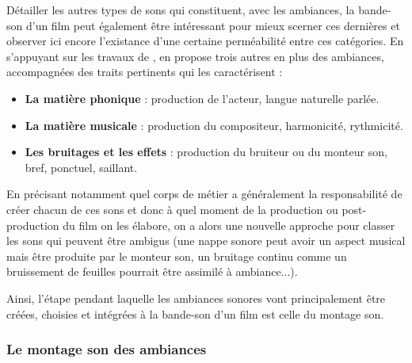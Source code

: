 ﻿\documentclass[12pt]{article}
\begin{document}
Détailler les autres types de sons qui constituent, avec les ambiances, la bande-son d'un film peut également être intéressant pour mieux scerner ces dernières et observer ici encore l'existance d'une certaine perméabilité entre ces catégories. En s'appuyant sur les travaux de \textcite{balibar2015chaine}, \textcite{denizart_lemergence_2017} en propose trois autres en plus des ambiances, accompagnées des traits pertinents qui les caractérisent :
\vspace{1em}

\begin{itemize}
    \setlength\itemsep{0.8em}
    \item \textbf{La matière phonique} : production de l'acteur, langue naturelle parlée.
    \item \textbf{La matière musicale} : production du compositeur, harmonicité, rythmicité.
    \item \textbf{Les bruitages et les effets} : production du bruiteur ou du monteur son, bref, ponctuel, saillant.
\end{itemize}
\vspace{1em}

En précisant notamment quel corps de métier a généralement la responsabilité de créer chacun de ces sons et donc à quel moment de la production ou post-production du film on les élabore, on a alors une nouvelle approche pour classer les sons qui peuvent être ambigus (une nappe sonore peut avoir un aspect musical mais être produite par le monteur son, un bruitage continu comme un bruissement de feuilles pourrait être assimilé à ambiance...).

Ainsi, l'étape pendant laquelle les ambiances sonores vont principalement être créées, choisies et intégrées à la bande-son d'un film est celle du montage son.

\subsubsection{Le montage son des ambiances}
\end{document}
